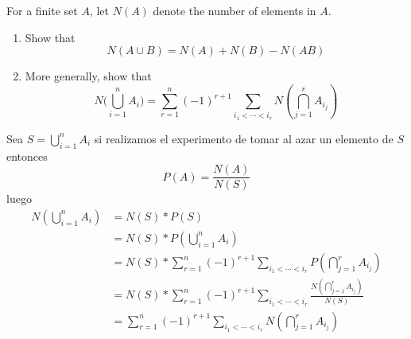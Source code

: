 \item For a finite set $A$, let $N(A)$ denote the number of elements in $A$.
\begin{enumerate}
    \item Show that
    \[ N(A \cup B) = N(A) + N(B) - N(AB) \]

    
    \item More generally, show that
    \[
        N\Big( \bigcup_{i=1}^n A_i \Big) = \sum_{r=1}^n (-1)^{r+1} \sum_{i_1 < \cdots < i_r} N(\bigcap_{j=1}^r A_{i_j}) 
    \]
\end{enumerate}

Sea $S = \bigcup_{i=1}^n A_i$ si realizamos el experimento de tomar al azar un elemento de $S$ entonces 
\[ P(A) = \frac{N(A)}{N(S)} \]
luego
\begin{align*}
    N(\bigcup_{i=1}^n A_i) &= N(S) * P(S)\\
    &= N(S) * P(\bigcup_{i=1}^n A_i)\\
    &= N(S) * \sum_{r=1}^n (-1)^{r+1} \sum_{i_1 < \cdots < i_r} P(\bigcap_{j=1}^r A_{i_j})\\
    &= 
    N(S) * \sum_{r=1}^n (-1)^{r+1} \sum_{i_1 < \cdots < i_r} \frac{N(\bigcap_{j=1}^r A_{i_j})}{N(S)}\\
    &= 
    \sum_{r=1}^n (-1)^{r+1} \sum_{i_1 < \cdots < i_r} N(\bigcap_{j=1}^r A_{i_j})\\
\end{align*}
